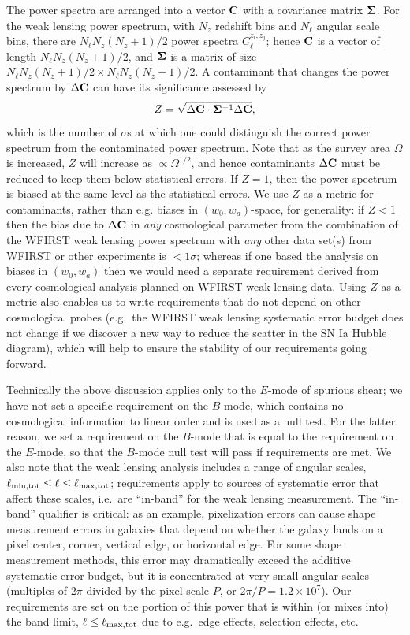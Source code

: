 \documentclass[usenatbib]{mnras}
\begin{document}
The power spectra are arranged into a vector ${\bf C}$ with
a covariance matrix ${\bf\Sigma}$. For the weak lensing power spectrum, with
$N_z$ redshift bins and $N_\ell$ angular scale bins, there are $N_\ell
N_z(N_z+1)/2$ power spectra $C_\ell^{z_i,z_j}$; hence ${\bf C}$ is a
vector of length $N_\ell N_z(N_z+1)/2$, and ${\bf\Sigma}$ is a matrix
of size $N_\ell N_z(N_z+1)/2 \times N_\ell N_z(N_z+1)/2$. A
contaminant that changes the power spectrum by $\Delta {\bf C}$ can
have its significance assessed by
\begin{equation}
Z = \sqrt{\Delta{\bf C}\cdot{\bf\Sigma}^{-1}\Delta{\bf C}},
\label{eq:alpha}
\end{equation}
which is the number of $\sigma$s at which one could distinguish the
correct power spectrum from the contaminated power spectrum. Note that
as the survey area $\Omega$ is increased, $Z$ will increase as
$\propto\Omega^{1/2}$, and hence contaminants $\Delta{\bf C}$ must be
reduced to keep them below statistical errors. If $Z=1$, then the
power spectrum is biased at the same level as the statistical
errors. We use $Z$ as a metric for contaminants, rather than
e.g. biases in $(w_0,w_a)$-space, for generality: if $Z<1$ then the
bias due to $\Delta{\bf C}$ in {\em any} cosmological parameter from
the combination of the WFIRST weak lensing power spectrum with {\em any} other
data set(s) from WFIRST or other experiments is $<1\sigma$; whereas if
one based the analysis on biases in $(w_0,w_a)$ then we would need a
separate requirement derived from every cosmological analysis planned
on WFIRST weak lensing data. Using $Z$ as a metric also enables us to write
requirements that do not depend on other cosmological probes (e.g.\
the WFIRST weak lensing systematic error budget does not change if we discover a
new way to reduce the scatter in the SN Ia Hubble diagram), which will
help to ensure the stability of our requirements going forward.

Technically the above discussion applies only to the $E$-mode of
spurious shear; we have not set a specific requirement on the
$B$-mode, which contains no cosmological information to linear order
and is used as a null test. For the latter reason, we set a
requirement on the $B$-mode that is equal to the requirement on the
$E$-mode, so that the $B$-mode null test will pass if requirements are
met. We also note that the weak lensing analysis includes a range of angular
scales, $\ell_{\rm min,tot}\le \ell \le \ell_{\rm max,tot}$;
requirements apply to sources of systematic error that affect these
scales, i.e.\ are ``in-band'' for the weak lensing measurement. The ``in-band''
qualifier is critical: as an example, pixelization errors can cause
shape measurement errors in galaxies that depend on whether the galaxy
lands on a pixel center, corner, vertical edge, or horizontal
edge. For some shape measurement methods, this error may dramatically
exceed the additive systematic error budget, but it is concentrated at
very small angular scales (multiples of $2\pi$ divided by the pixel
scale $P$, or $2\pi/P = 1.2\times 10^7$). Our requirements are set on
the portion of this power that is within (or mixes into) the band
limit, $\ell\le\ell_{\rm max,tot}$ due to e.g.\ edge effects,
selection effects, etc.
\end{document}
